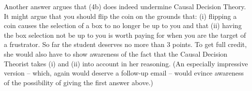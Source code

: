 \documentclass[12pt,letterpaper]{article}
\begin{document}
\begin{enumerate}
{\begin{enumerate}
{Another answer argues that (4b) does indeed undermine Causal Decision Theory. It might argue that you should flip the coin on the grounds that: (i) flipping a coin causes the selection of a box to no longer be up to you and that (ii) having the box selection not be up to you is worth paying for when you are the target of a frustrator. So far the student deserves no more than 3 points. To get full credit, she would also have to show awareness of the fact that the Causal Decision Theorist takes (i) and (ii) into account in her reasoning. (An especially impressive version -- which, again would deserve a follow-up email -- would evince awareness of the possibility of giving the first answer above.)


}



\end{enumerate}
}
\end{enumerate}
\end{document}
